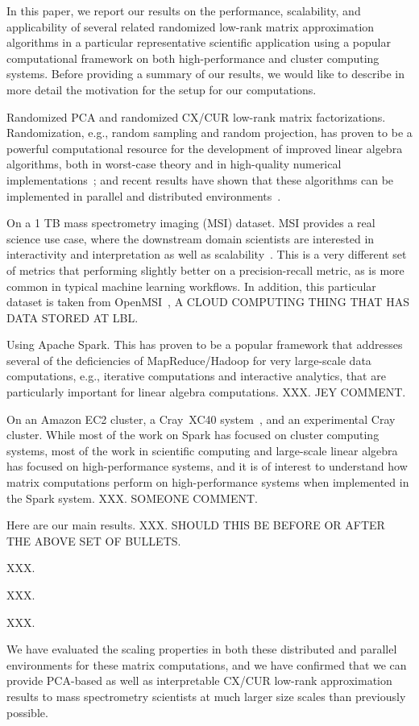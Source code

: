 In this paper, we report our results on the performance, scalability, and applicability of several related randomized low-rank matrix approximation algorithms in a particular representative scientific application using a popular computational framework on both high-performance and cluster computing systems.
Before providing a summary of our results, we would like to describe in more detail the motivation for the setup for our computations.
\begin{compactitem}
\item
Randomized PCA and randomized CX/CUR low-rank matrix factorizations. 
Randomization, e.g., random sampling and random projection, has proven to be a powerful computational resource for the development of improved linear algebra algorithms, both in worst-case theory and in high-quality numerical implementations~\cite{Mah-mat-rev_BOOK}; and recent results have shown that these algorithms can be implemented in parallel and distributed environments~\cite{YMM15_TR}.
\item
On a 1 TB mass spectrometry imaging (MSI) dataset.
MSI provides a real science use case, where the downstream domain scientists are interested in interactivity and interpretation as well as scalability~\cite{YRPMB15}.
This is a very different set of metrics that performing slightly better on a precision-recall metric, as is more common in typical machine learning workflows.
In addition, this particular dataset is taken from OpenMSI~\cite{OpenMIS13}, A CLOUD COMPUTING THING THAT HAS DATA STORED AT LBL.
\item
Using Apache Spark. 
This has proven to be a popular framework that addresses several of the deficiencies of MapReduce/Hadoop for very large-scale data computations, e.g., iterative computations and interactive analytics, that are particularly important for linear algebra computations.
XXX.  JEY COMMENT.
\item
On an Amazon EC2 cluster, a Cray\textregistered~XC40\textsuperscript{\tiny\texttrademark}
system~\cite{alverson2012cray,craycascadesc12}, and an experimental Cray cluster.  
While most of the work on Spark has focused on cluster computing systems, most of the work in scientific computing and large-scale linear algebra has focused on high-performance systems, and it is of interest to understand how matrix computations perform on high-performance systems when implemented in the Spark system.
XXX.  SOMEONE COMMENT.
\end{compactitem}

Here are our main results.
XXX.  SHOULD THIS BE BEFORE OR AFTER THE ABOVE SET OF BULLETS.
\begin{compactitem}
\item
XXX.
\item
XXX.
\item
XXX.
\item
We have evaluated the scaling properties in both these distributed and parallel environments for these matrix computations, and we have confirmed that we can provide PCA-based as well as interpretable CX/CUR low-rank approximation results to mass spectrometry scientists at much larger size scales than previously possible.  
\end{compactitem}

